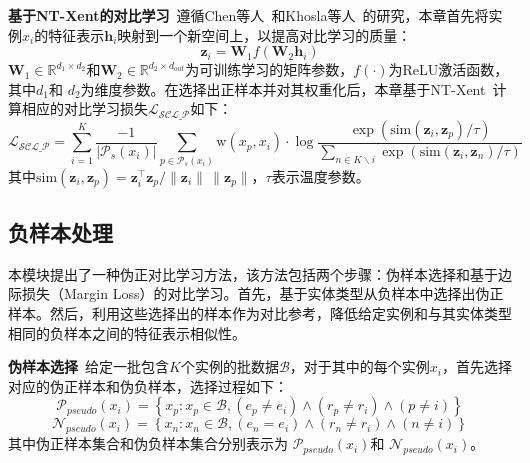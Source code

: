 \textbf{基于NT-Xent的对比学习}~遵循Chen等人~\cite{chen2020simple}和Khosla等人~\cite{khosla2020supervised}的研究，本章首先将实例$x_{i}$的特征表示$\boldsymbol{h}_{i}$映射到一个新空间上，以提高对比学习的质量：
\begin{equation}
\label{map}
  \boldsymbol{z}_{i}=\boldsymbol{W}_{1} f\left(\boldsymbol{W}_{2} \boldsymbol{h}_{i}\right)
\end{equation}
$\boldsymbol{W}_{1} \in {\mathbb{R}}^{d_{1} \times d_{2}}$和$\boldsymbol{W}_{2} \in {\mathbb{R}}^{d_{2} \times d_{out}}$为可训练学习的矩阵参数，$f(\cdot)$为ReLU激活函数，其中$d_{1}$和 $d_{2}$为维度参数。在选择出正样本并对其权重化后，本章基于NT-Xent~\cite{chen2020simple}计算相应的对比学习损失$\mathcal{L_\textrm{SCL\_P}}$如下：
\begin{equation}
\label{nt_loss}
\mathcal{L_\textrm{SCL\_P}}=\sum_{i=1}^{K} \frac{-1}{|\mathcal{P}_{s}\left(x_{i}\right)|} \sum_{p \in \mathcal{P}_{s}\left(x_{i}\right)} {\textrm{w}}(x_{p}, x_{i}) \cdot \log \frac{\exp \left(\textrm{sim}\left(\boldsymbol{z}_{i},\boldsymbol{z}_{p}\right) / \tau\right)}{\sum_{n \in K\backslash i }\exp \left(\textrm{sim}\left(\boldsymbol{z}_{i},\boldsymbol{z}_{n}\right) / \tau\right)}
\end{equation}
其中$\textrm{sim}\left(\boldsymbol{z}_{i},\boldsymbol{z}_{p}\right)=\boldsymbol{z}_{i}^\top\boldsymbol{z}_{p}/\lVert\boldsymbol{z}_{i}\rVert \,\lVert\boldsymbol{z}_{p}\rVert$，$\tau$表示温度参数。

\subsection{负样本处理}
本模块提出了一种伪正对比学习方法，该方法包括两个步骤：伪样本选择和基于边际损失（Margin Loss）的对比学习。首先，基于实体类型从负样本中选择出伪正样本。然后，利用这些选择出的样本作为对比参考，降低给定实例和与其实体类型相同的负样本之间的特征表示相似性。

\textbf{伪样本选择}~给定一批包含$K$个实例的批数据$\mathcal{B}$，对于其中的每个实例$x_{i}$，首先选择对应的伪正样本和伪负样本，选择过程如下：
\begin{equation}
  \mathcal{P}_{pseudo}\left(x_{i}\right)=\left\{x_{p}: x_{p} \in \mathcal{B}, (e_{p} \neq e_{i}) \wedge (r_{p} \neq r_{i}) \wedge (p \neq i)\right\}
\end{equation}
\begin{equation}
  \mathcal{N}_{pseudo}\left(x_{i}\right)=\left\{x_{n}: x_{n} \in \mathcal{B}, (e_{n}=e_{i}) \wedge (r_{n} \neq r_{i}) \wedge (n \neq i)\right\}
\end{equation}
其中伪正样本集合和伪负样本集合分别表示为 $\mathcal{P}_{pseudo}\left(x_{i}\right)$和 $\mathcal{N}_{pseudo}\left(x_{i}\right)$。

